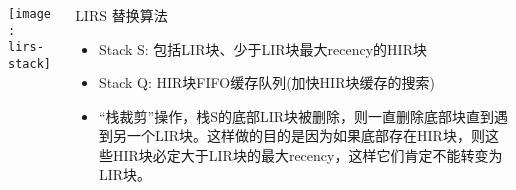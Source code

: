 \begin{frame}[plain]
	\frametitle{ }
	\begin{columns}
		\begin{column}{.5\textwidth}
			\centering
			\texttt{[image: lirs-stack]}
			
		\end{column}
		
		\begin{column}{.5\textwidth}
			LIRS 替换算法
			
			\begin{itemize}
				\item Stack S:  包括LIR块、少于LIR块最大recency的HIR块
				\item Stack Q:  HIR块FIFO缓存队列(加快HIR块缓存的搜索)

				\item “栈裁剪”操作，栈S的底部LIR块被删除，则一直删除底部块直到遇到另一个LIR块。这样做的目的是因为如果底部存在HIR块，则这些HIR块必定大于LIR块的最大recency，这样它们肯定不能转变为LIR块。
				
				
			\end{itemize}
			
		\end{column}
		
		
	\end{columns}
\end{frame}


